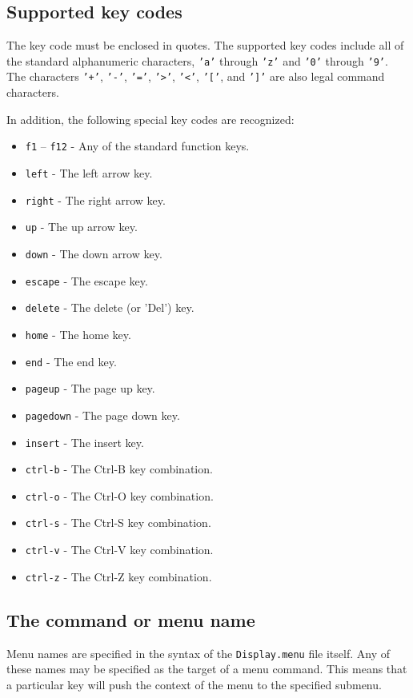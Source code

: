 \subsection{Supported key codes}
The key code must be enclosed in quotes.
The supported key codes include all of the standard alphanumeric characters, {\tt 'a'} through {\tt 'z'} and {\tt '0'} through {\tt '9'}. The characters {\tt '+'}, {\tt '-'}, {\tt '='}, {\tt '>'}, {\tt '<'}, {\tt '['}, and {\tt ']'} are also legal command characters.

In addition, the following special key codes are recognized:
\begin{itemize}
\item {\tt f1} -- {\tt f12} - Any of the standard function keys.
\item {\tt left} - The left arrow key.
\item {\tt right} - The right arrow key.
\item {\tt up} - The up arrow key.
\item {\tt down} - The down arrow key.
\item {\tt escape} - The escape key.
\item {\tt delete} - The delete (or 'Del') key.
\item {\tt home} - The home key.
\item {\tt end} - The end key.
\item {\tt pageup} - The page up key.
\item {\tt pagedown} - The page down key.
\item {\tt insert} - The insert key.
\item {\tt ctrl-b} - The Ctrl-B key combination.
\item {\tt ctrl-o} - The Ctrl-O key combination.
\item {\tt ctrl-s} - The Ctrl-S key combination.
\item {\tt ctrl-v} - The Ctrl-V key combination.
\item {\tt ctrl-z} - The Ctrl-Z key combination.
\end{itemize}

\subsection{The command or menu name}
Menu names are specified in the syntax of the {\tt Display.menu} file
itself. Any of these names may be specified as the target of a menu
command. This means that a particular key will push the context of the
menu to the specified submenu.

